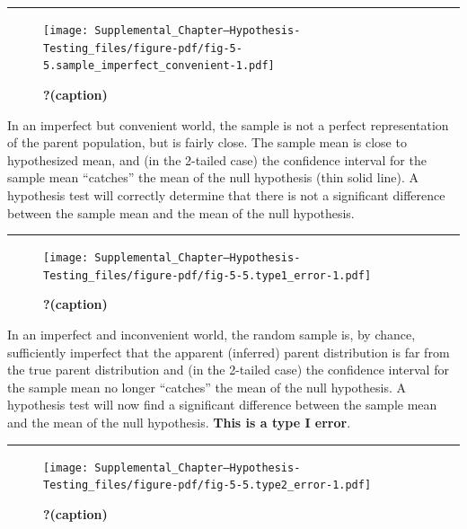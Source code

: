 \documentclass[
  letterpaper,
  DIV=11,
  numbers=noendperiod]{scrartcl}
\begin{document}
\begin{center}\rule{0.5\linewidth}{0.5pt}\end{center}

\begin{figure}

{\centering \texttt{[image: Supplemental\_Chapter---Hypothesis-Testing\_files/figure-pdf/fig-5-5.sample\_imperfect\_convenient-1.pdf]}

}

\caption{\label{fig-5-5.sample_imperfect_convenient}\textbf{?(caption)}}

\end{figure}

In an imperfect but convenient world, the sample is not a perfect
representation of the parent population, but is fairly close. The sample
mean is close to hypothesized mean, and (in the 2-tailed case) the
confidence interval for the sample mean ``catches'' the mean of the null
hypothesis (thin solid line). A hypothesis test will correctly determine
that there is not a significant difference between the sample mean and
the mean of the null hypothesis.

\begin{center}\rule{0.5\linewidth}{0.5pt}\end{center}

\begin{figure}

{\centering \texttt{[image: Supplemental\_Chapter---Hypothesis-Testing\_files/figure-pdf/fig-5-5.type1\_error-1.pdf]}

}

\caption{\label{fig-5-5.type1_error}\textbf{?(caption)}}

\end{figure}

In an imperfect and inconvenient world, the random sample is, by chance,
sufficiently imperfect that the apparent (inferred) parent distribution
is far from the true parent distribution and (in the 2-tailed case) the
confidence interval for the sample mean no longer ``catches'' the mean
of the null hypothesis. A hypothesis test will now find a significant
difference between the sample mean and the mean of the null hypothesis.
\textbf{This is a type I error}.

\begin{center}\rule{0.5\linewidth}{0.5pt}\end{center}

\begin{figure}

{\centering \texttt{[image: Supplemental\_Chapter---Hypothesis-Testing\_files/figure-pdf/fig-5-5.type2\_error-1.pdf]}

}

\caption{\label{fig-5-5.type2_error}\textbf{?(caption)}}

\end{figure}
\end{document}
